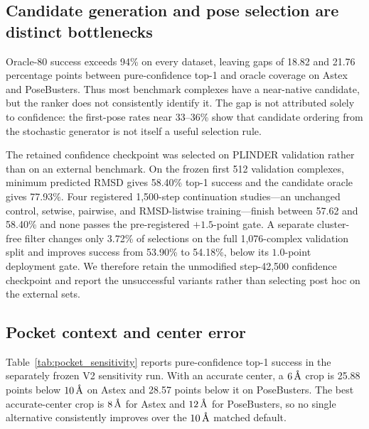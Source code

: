 \subsection{Candidate generation and pose selection are distinct bottlenecks}

Oracle-80 success exceeds 94\% on every dataset, leaving gaps of 18.82 and
21.76 percentage points between pure-confidence top-1 and oracle coverage on
Astex and PoseBusters. Thus most benchmark complexes have a
near-native candidate, but the ranker does not consistently identify it.
The gap is not attributed solely to confidence: the first-pose rates near
33--36\% show that candidate ordering from the stochastic generator is not
itself a useful selection rule.

The retained confidence checkpoint was selected on PLINDER validation rather
than on an external benchmark. On the frozen first 512 validation complexes,
minimum predicted RMSD gives 58.40\% top-1 success and the candidate oracle
gives 77.93\%. Four registered 1,500-step continuation studies---an unchanged
control, setwise, pairwise, and RMSD-listwise training---finish between 57.62
and 58.40\% and none passes the pre-registered \(+1.5\)-point gate. A separate
cluster-free filter changes only 3.72\% of selections on the full 1,076-complex
validation split and improves success from 53.90\% to 54.18\%, below its
\(1.0\)-point deployment gate. We therefore retain the unmodified step-42,500
confidence checkpoint and report the unsuccessful variants rather than
selecting post hoc on the external sets.

\subsection{Pocket context and center error}

Table~\ref{tab:pocket_sensitivity} reports pure-confidence top-1 success in
the separately frozen V2 sensitivity run. With an accurate center, a
\(6\,\text{\normalfont\AA}\) crop is 25.88 points below \(10\,\text{\normalfont\AA}\) on Astex and
28.57 points below it on PoseBusters. The best accurate-center crop is
\(8\,\text{\normalfont\AA}\) for Astex and \(12\,\text{\normalfont\AA}\) for PoseBusters, so no
single alternative consistently improves over the \(10\,\text{\normalfont\AA}\) matched
default.

